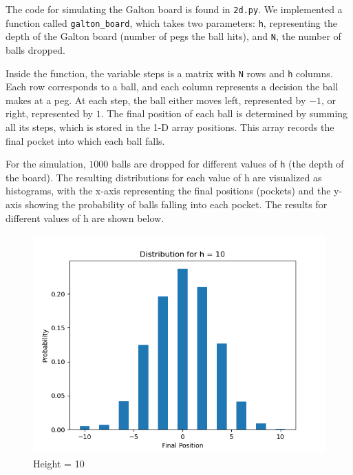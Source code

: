 \begin{solution}
	The code for simulating the Galton board is found in \texttt{2d.py}. We implemented a function called \texttt{galton\_board}, which takes two parameters: \texttt{h}, representing the depth of the Galton board (number of pegs the ball hits), and \texttt{N}, the number of balls dropped.

Inside the function, the variable steps is a matrix with \texttt{N} rows and \texttt{h} columns. Each row corresponds to a ball, and each column represents a decision the ball makes at a peg. At each step, the ball either moves left, represented by $-1$, or right, represented by $1$. The final position of each ball is determined by summing all its steps, which is stored in the 1-D array positions. This array records the final pocket into which each ball falls.

	For the simulation, $1000$ balls are dropped for different values of \texttt{h} (the depth of the board). The resulting distributions for each value of h are visualized as histograms, with the x-axis representing the final positions (pockets) and the y-axis showing the probability of balls falling into each pocket. The results for different values of h are shown below.
	\begin{figure}[H]
		\centering
		\begin{minipage}{0.5\textwidth}
			\centering
			\includegraphics[width=\linewidth]{../images/2d1.png}
			\caption{Height = 10}
		\end{minipage}\hfill
		\begin{minipage}{0.5\textwidth}
			\centering

\end{minipage}
\end{figure}
\end{solution}
